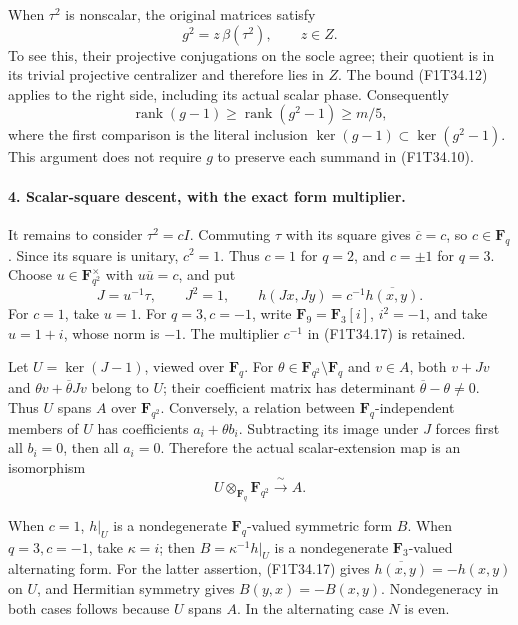 When \(\tau^2\) is nonscalar, the original matrices
satisfy
\[
                 g^2=z\,\beta(\tau^2),\qquad z\in Z.
 \tag{F1T34.15}
\]
To see this, their projective conjugations on the
socle agree; their quotient is in its trivial
projective centralizer and therefore lies in \(Z\).
The bound (F1T34.12) applies to the right side,
including its actual scalar phase. Consequently
\[
 \operatorname{rank}(g-1)
 \ge\operatorname{rank}(g^2-1)\ge m/5,
 \tag{F1T34.16}
\]
where the first comparison is the literal inclusion
\(\ker(g-1)\subset\ker(g^2-1)\).
This argument does not require \(g\) to preserve
each summand in (F1T34.10).

\paragraph{4. Scalar-square descent, with the exact form multiplier.}
It remains to consider \(\tau^2=cI\). Commuting
\(\tau\) with its square gives \(\overline c=c\),
so \(c\in\mathbf F_q\). Since its square is unitary,
\(c^2=1\). Thus \(c=1\) for \(q=2\), and
\(c=\pm1\) for \(q=3\).
Choose \(u\in\mathbf F_{q^2}^{\times}\) with
\(u\overline u=c\), and put
\[
 J=u^{-1}\tau,
 \qquad J^2=1,
 \qquad h(Jx,Jy)=c^{-1}\overline{h(x,y)}.
 \tag{F1T34.17}
\]
For \(c=1\), take \(u=1\). For \(q=3,c=-1\),
write \(\mathbf F_9=\mathbf F_3[i]\), \(i^2=-1\),
and take \(u=1+i\), whose norm is \(-1\).
The multiplier \(c^{-1}\) in (F1T34.17) is retained.

Let \(U=\ker(J-1)\), viewed over \(\mathbf F_q\).
For \(\theta\in\mathbf F_{q^2}\setminus\mathbf F_q\)
and \(v\in A\), both
\(v+Jv\) and \(\theta v+\overline\theta Jv\)
belong to \(U\); their coefficient matrix has
determinant \(\overline\theta-\theta\ne0\).
Thus \(U\) spans \(A\) over \(\mathbf F_{q^2}\).
Conversely, a relation between \(\mathbf F_q\)-independent
members of \(U\) has coefficients \(a_i+\theta b_i\).
Subtracting its image under \(J\) forces first all
\(b_i=0\), then all \(a_i=0\). Therefore the actual
scalar-extension map is an isomorphism
\[
        U\otimes_{\mathbf F_q}\mathbf F_{q^2}
                   \xrightarrow{\ \sim\ }A.
 \tag{F1T34.18}
\]

When \(c=1\), \(h|_U\) is a nondegenerate
\(\mathbf F_q\)-valued symmetric form \(B\).
When \(q=3,c=-1\), take \(\kappa=i\); then
\(B=\kappa^{-1}h|_U\) is a nondegenerate
\(\mathbf F_3\)-valued alternating form.
For the latter assertion, (F1T34.17) gives
\(\overline{h(x,y)}=-h(x,y)\) on \(U\), and
Hermitian symmetry gives \(B(y,x)=-B(x,y)\).
Nondegeneracy in both cases follows because \(U\)
spans \(A\). In the alternating case \(N\) is even.

